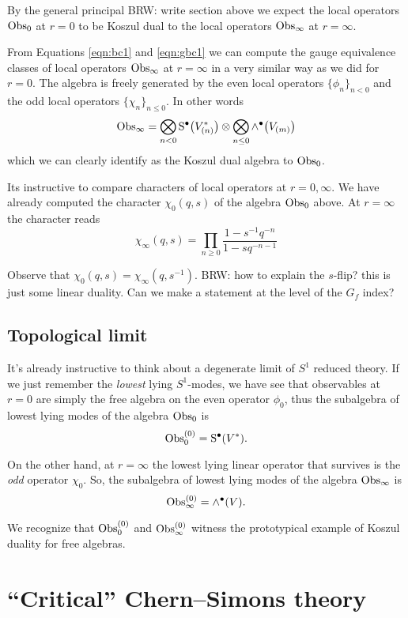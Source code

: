 \documentclass[11pt]{amsart}
\def\brian#1{{\textcolor{blue!65!red}{BRW: {#1}}}}
\begin{document}
By the general principal \brian{write section above} we expect the local operators ${\rm Obs}_0$ at $r = 0$ to be Koszul dual to the local operators ${\rm Obs}_\infty$ at $r = \infty$. 

From Equations \eqref{eqn:bc1} and \eqref{eqn:gbc1} we can compute the gauge equivalence classes of local operators ${\rm Obs}_\infty$ at $r = \infty$ in a very similar way as we did for $r = 0$. 
The algebra is freely generated by the even local operators $\{\phi_n\}_{n < 0}$ and the odd local operators $\{\chi_n\}_{n \leq 0}$. 
In other words
\[
{\rm Obs}_\infty = \bigotimes_{n < 0} {\rm S}^\bullet \big(V^*_{(n)}\big) \otimes \bigotimes_{n \leq 0} \wedge^\bullet \big(V_{(m)}\big)
\]
which we can clearly identify as the Koszul dual algebra to ${\rm Obs}_0$. 

Its instructive to compare characters of local operators at $r = 0, \infty$. 
We have already computed the character $\chi_0(q,s)$ of the algebra ${\rm Obs}_0$ above. 
At $r=\infty$ the character reads 
\[
\chi_\infty (q,s) = \prod_{n \geq 0} \frac{1 - s^{-1}q^{-n}}{1 - s q^{-n-1}}
\]

Observe that $\chi_0 (q,s) = \chi_\infty (q, s^{-1})$. 
\brian{how to explain the $s$-flip? this is just some linear duality. Can we make a statement at the level of the $G_f$ index?}

\subsection*{Topological limit}

It's already instructive to think about a degenerate limit of $S^1$ reduced theory. 
If we just remember the {\em lowest} lying $S^1$-modes, we have see that observables at $r=0$ are simply the free algebra on the even operator $\phi_0$, thus the subalgebra of lowest lying modes of the algebra ${\rm Obs}_0$ is
\[
{\rm Obs}_0^{(0)} = {\rm S}^\bullet(V^*).
\]

On the other hand, at $r=\infty$ the lowest lying linear operator that survives is the {\em odd} operator $\chi_0$.
So, the subalgebra of lowest lying modes of the algebra ${\rm Obs}_\infty$ is
\[
{\rm Obs}_\infty^{(0)} = \wedge^\bullet(V) .
\]

We recognize that ${\rm Obs}_0^{(0)}$ and ${\rm Obs}_\infty^{(0)}$ witness the prototypical example of Koszul duality for free algebras. 




\section{``Critical'' Chern--Simons theory}
\end{document}
